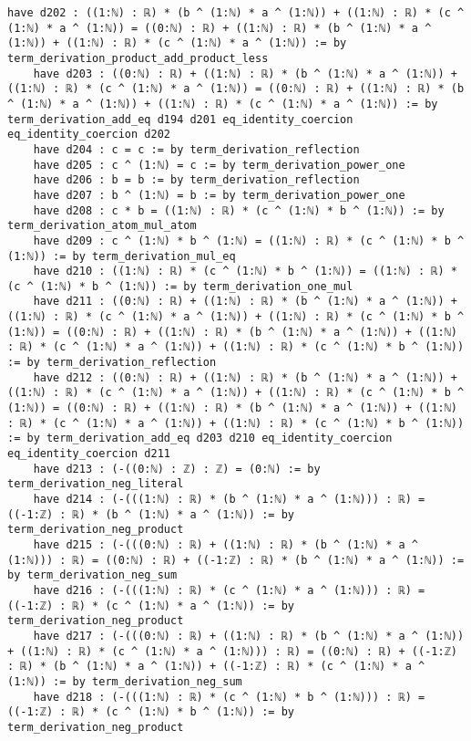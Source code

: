 \documentclass{article}
\begin{document}
\begin{tcolorbox}[colback=white!10, width=\linewidth]
\begin{lstlisting}[language=Lean4]
    have d202 : ((1:ℕ) : ℝ) * (b ^ (1:ℕ) * a ^ (1:ℕ)) + ((1:ℕ) : ℝ) * (c ^ (1:ℕ) * a ^ (1:ℕ)) = ((0:ℕ) : ℝ) + ((1:ℕ) : ℝ) * (b ^ (1:ℕ) * a ^ (1:ℕ)) + ((1:ℕ) : ℝ) * (c ^ (1:ℕ) * a ^ (1:ℕ)) := by term_derivation_product_add_product_less
    have d203 : ((0:ℕ) : ℝ) + ((1:ℕ) : ℝ) * (b ^ (1:ℕ) * a ^ (1:ℕ)) + ((1:ℕ) : ℝ) * (c ^ (1:ℕ) * a ^ (1:ℕ)) = ((0:ℕ) : ℝ) + ((1:ℕ) : ℝ) * (b ^ (1:ℕ) * a ^ (1:ℕ)) + ((1:ℕ) : ℝ) * (c ^ (1:ℕ) * a ^ (1:ℕ)) := by term_derivation_add_eq d194 d201 eq_identity_coercion eq_identity_coercion d202
    have d204 : c = c := by term_derivation_reflection
    have d205 : c ^ (1:ℕ) = c := by term_derivation_power_one
    have d206 : b = b := by term_derivation_reflection
    have d207 : b ^ (1:ℕ) = b := by term_derivation_power_one
    have d208 : c * b = ((1:ℕ) : ℝ) * (c ^ (1:ℕ) * b ^ (1:ℕ)) := by term_derivation_atom_mul_atom
    have d209 : c ^ (1:ℕ) * b ^ (1:ℕ) = ((1:ℕ) : ℝ) * (c ^ (1:ℕ) * b ^ (1:ℕ)) := by term_derivation_mul_eq
    have d210 : ((1:ℕ) : ℝ) * (c ^ (1:ℕ) * b ^ (1:ℕ)) = ((1:ℕ) : ℝ) * (c ^ (1:ℕ) * b ^ (1:ℕ)) := by term_derivation_one_mul
    have d211 : ((0:ℕ) : ℝ) + ((1:ℕ) : ℝ) * (b ^ (1:ℕ) * a ^ (1:ℕ)) + ((1:ℕ) : ℝ) * (c ^ (1:ℕ) * a ^ (1:ℕ)) + ((1:ℕ) : ℝ) * (c ^ (1:ℕ) * b ^ (1:ℕ)) = ((0:ℕ) : ℝ) + ((1:ℕ) : ℝ) * (b ^ (1:ℕ) * a ^ (1:ℕ)) + ((1:ℕ) : ℝ) * (c ^ (1:ℕ) * a ^ (1:ℕ)) + ((1:ℕ) : ℝ) * (c ^ (1:ℕ) * b ^ (1:ℕ)) := by term_derivation_reflection
    have d212 : ((0:ℕ) : ℝ) + ((1:ℕ) : ℝ) * (b ^ (1:ℕ) * a ^ (1:ℕ)) + ((1:ℕ) : ℝ) * (c ^ (1:ℕ) * a ^ (1:ℕ)) + ((1:ℕ) : ℝ) * (c ^ (1:ℕ) * b ^ (1:ℕ)) = ((0:ℕ) : ℝ) + ((1:ℕ) : ℝ) * (b ^ (1:ℕ) * a ^ (1:ℕ)) + ((1:ℕ) : ℝ) * (c ^ (1:ℕ) * a ^ (1:ℕ)) + ((1:ℕ) : ℝ) * (c ^ (1:ℕ) * b ^ (1:ℕ)) := by term_derivation_add_eq d203 d210 eq_identity_coercion eq_identity_coercion d211
    have d213 : (-((0:ℕ) : ℤ) : ℤ) = (0:ℕ) := by term_derivation_neg_literal
    have d214 : (-(((1:ℕ) : ℝ) * (b ^ (1:ℕ) * a ^ (1:ℕ))) : ℝ) = ((-1:ℤ) : ℝ) * (b ^ (1:ℕ) * a ^ (1:ℕ)) := by term_derivation_neg_product
    have d215 : (-(((0:ℕ) : ℝ) + ((1:ℕ) : ℝ) * (b ^ (1:ℕ) * a ^ (1:ℕ))) : ℝ) = ((0:ℕ) : ℝ) + ((-1:ℤ) : ℝ) * (b ^ (1:ℕ) * a ^ (1:ℕ)) := by term_derivation_neg_sum
    have d216 : (-(((1:ℕ) : ℝ) * (c ^ (1:ℕ) * a ^ (1:ℕ))) : ℝ) = ((-1:ℤ) : ℝ) * (c ^ (1:ℕ) * a ^ (1:ℕ)) := by term_derivation_neg_product
    have d217 : (-(((0:ℕ) : ℝ) + ((1:ℕ) : ℝ) * (b ^ (1:ℕ) * a ^ (1:ℕ)) + ((1:ℕ) : ℝ) * (c ^ (1:ℕ) * a ^ (1:ℕ))) : ℝ) = ((0:ℕ) : ℝ) + ((-1:ℤ) : ℝ) * (b ^ (1:ℕ) * a ^ (1:ℕ)) + ((-1:ℤ) : ℝ) * (c ^ (1:ℕ) * a ^ (1:ℕ)) := by term_derivation_neg_sum
    have d218 : (-(((1:ℕ) : ℝ) * (c ^ (1:ℕ) * b ^ (1:ℕ))) : ℝ) = ((-1:ℤ) : ℝ) * (c ^ (1:ℕ) * b ^ (1:ℕ)) := by term_derivation_neg_product

\end{lstlisting}
\end{tcolorbox}
\end{document}
